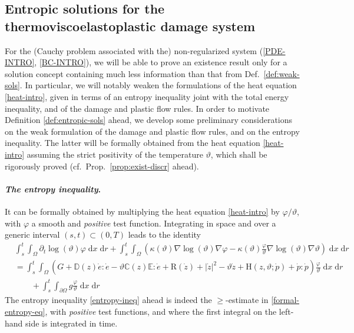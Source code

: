 \documentclass[a4paper,10pt,reqno]{amsart}
\numberwithin{equation}{section}
\numberwithin{equation}{section}
\def\dd{\;\!\mathrm{d}} %
\newcommand{\teta}{\vartheta}
\newcommand{\condu}{\kappa}
\newcommand{\dip}[3]{\mathrm{H}(#1,#2;#3)}
\newcommand{\did}[1]{\mathrm{R}(#1)}
\newcommand{\ass}{a_{\mathrm{s}}}
\newcommand{\EEE}{\color{black}}
\newcommand{\MMM}{\color{black}}%
\begin{document}
\subsection{Entropic solutions for the thermoviscoelastoplastic damage system}
\label{ss:2.3}
For the (Cauchy problem associated with the)  non-regularized system (\ref{PDE-INTRO}, \ref{BC-INTRO}),
we will be able to prove an existence result only for a solution concept containing much less information than that
from Def.\ \ref{def:weak-sols}. In particular, we will  notably weaken the formulations of the heat equation \eqref{heat-intro}, given in terms of an entropy inequality joint with the total energy inequality, and of the damage and plastic flow rules. In order  to motivate Definition 
\ref{def:entropic-sols} ahead, we develop some preliminary considerations \MMM on the weak formulation of the damage and plastic flow rules, and on the entropy inequality. The latter will be formally obtained from the heat equation 
\eqref{heat-intro} assuming the strict positivity of the temperature  $\teta$, which   shall be rigorously proved  (cf.\ Prop.\ \ref{prop:exist-discr} ahead). \EEE
\paragraph{{\em The entropy inequality}.}
It
can be formally obtained by multiplying the heat equation 
\eqref{heat-intro}
by $\varphi/\teta$, with $\varphi $
 a smooth and \emph{positive} test function. Integrating in  space and over  a generic interval $(s,t) \subset (0,T)$  leads to the identity
\begin{equation}
\label{formal-entropy-eq}
\begin{aligned}
  & \int_s^t \int_\Omega \partial_t \log(\teta) \varphi \dd x \dd r + 
    \int_s^t \int_\Omega \left( \condu(\teta) \nabla \log(\teta) \nabla \varphi - \condu(\teta) \frac\varphi\teta \nabla \log(\teta) \nabla   \teta  \right) \dd x \dd r  
  \\ & = \int_s^t \int_\Omega 
   \left( G+ 
    \mathbb{D}(z) \dot{e} : \dot{e} -\teta \mathbb{C}(z)\mathbb{E}  : \dot{e}
+ \did {\dot z} + |\dot z|^2  %
 -\teta \dot z 
+ \dip{z}{\teta}{\dot{p}} + \dot{p}: \dot{p}
 \right) \frac{\varphi}\teta \dd x \dd r
 \\
 & \qquad 
   + \int_s^t \int_{\partial\Omega} g \frac\varphi\teta \dd x \dd r
\end{aligned}
\end{equation}
The entropy inequality \eqref{entropy-ineq} ahead  is indeed the $\geq$-estimate in \eqref{formal-entropy-eq}, with \emph{positive} test functions, and where the first integral on the left-hand side is integrated  in time.
\end{document}
